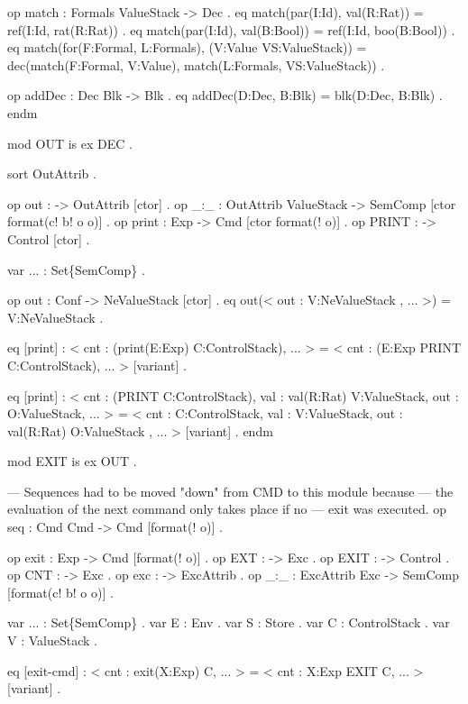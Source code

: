 \documentclass{llncs}%
\begin{document}
    op match : Formals ValueStack -> Dec .
    eq match(par(I:Id), val(R:Rat)) = ref(I:Id, rat(R:Rat)) .
    eq match(par(I:Id), val(B:Bool)) = ref(I:Id, boo(B:Bool)) .
    eq match(for(F:Formal, L:Formals), (V:Value VS:ValueStack)) =
        dec(match(F:Formal, V:Value),
          match(L:Formals, VS:ValueStack)) .

    op addDec : Dec Blk -> Blk .
    eq addDec(D:Dec, B:Blk) = blk(D:Dec, B:Blk) .
endm
\nwendcode{}\nwdocspar

\nwenddocs{}\endmoddef\nwstartdeflinemarkup\nwenddeflinemarkup
mod OUT is
    ex DEC .

    sort OutAttrib .

    op out : -> OutAttrib [ctor] .
    op _:_ : OutAttrib ValueStack -> SemComp [ctor format(c! b! o o)] .
    op print : Exp -> Cmd [ctor format(! o)] .
    op PRINT : -> Control [ctor] .

    var ... : Set\{SemComp\} .

    op out : Conf -> NeValueStack [ctor] .
    eq out(< out : V:NeValueStack , ... >) = V:NeValueStack .

    eq [print] :
        < cnt : (print(E:Exp) C:ControlStack), ... > =
        < cnt : (E:Exp PRINT C:ControlStack), ... > [variant] .

    eq [print] :
        < cnt : (PRINT C:ControlStack),
          val : val(R:Rat) V:ValueStack,
          out : O:ValueStack, ... > =
        < cnt : C:ControlStack,
          val : V:ValueStack,
          out : val(R:Rat) O:ValueStack , ... > [variant] .
endm
\nwendcode{}\nwdocspar

\nwenddocs{}\endmoddef\nwstartdeflinemarkup\nwenddeflinemarkup
mod EXIT is
    ex OUT .

    --- Sequences had to be moved "down" from CMD to this module because
    --- the evaluation of the next command only takes place if no
    --- exit was executed.
    op seq : Cmd Cmd -> Cmd [format(! o)] .

    op exit : Exp -> Cmd [format(! o)] .
    op EXT : -> Exc .
    op EXIT : -> Control .
    op CNT : -> Exc .
    op exc : -> ExcAttrib .
    op _:_ : ExcAttrib Exc -> SemComp [format(c! b! o o)] .

    var ... : Set\{SemComp\} . var E : Env . var S : Store .
    var C : ControlStack . var V : ValueStack .

    eq [exit-cmd] :
        < cnt : exit(X:Exp) C, ... > = < cnt : X:Exp EXIT C, ... > [variant] .
\end{document}
